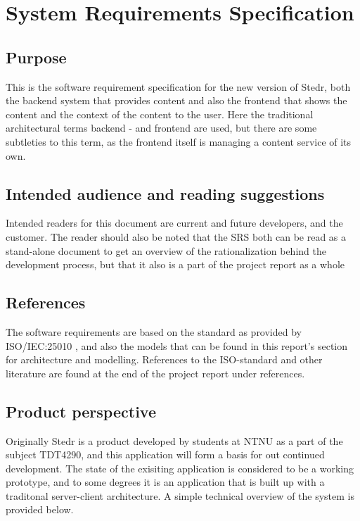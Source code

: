 \section{System Requirements Specification}

\subsection{Purpose}
This is the software requirement specification for the new version of Stedr, both the backend system that provides content and also the frontend that shows the content and the context of the content to the user. Here the traditional architectural terms backend - and frontend are used, but there are some subtleties to this term, as the frontend itself is managing a content service of its own. 

\subsection{Intended audience and reading suggestions}
Intended readers for this document are current and future developers, and the customer. The reader should also be noted that the SRS both can be read as a stand-alone document to get an overview of the rationalization behind the development process, but that it also is a part of the project report as a whole


\subsection{References}
The software requirements are based on the standard as provided by ISO/IEC:25010 \cite[10]{25010}, and also the models that can be found in this report’s section for architecture and modelling. References to the ISO-standard and other literature are found at the end of the project report under references.

\subsection{Product perspective}
Originally Stedr is a product developed by students at NTNU as a part of the subject TDT4290, and this application will form a basis for out continued development. The state of the exisiting application is considered to be a working prototype, and to some degrees it is an application that is built up with a traditonal server-client architecture. A simple technical overview of the system is provided below. 

